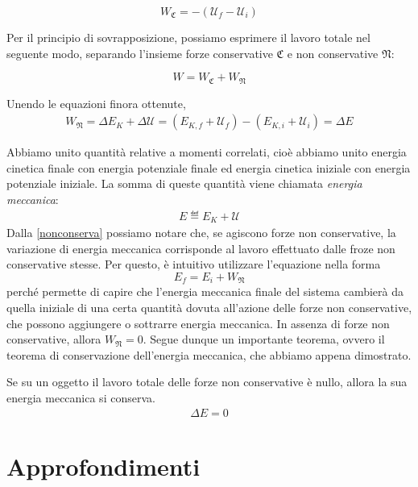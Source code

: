 \[ W_\mathfrak{C} = -(\mathcal{U}_f - \mathcal{U}_i) \]

\noindent Per il principio di sovrapposizione, possiamo esprimere il lavoro totale
nel seguente modo, separando l'insieme forze conservative $\mathfrak{C}$ e non conservative $\mathfrak{N}$:

\[ W = W_\mathfrak{C} + W_\mathfrak{N} \]

\noindent Unendo le equazioni finora ottenute,
\begin{align}
    W_\mathfrak{N} = \Delta E_K + \Delta\mathcal{U} = (E_{K,f} + \mathcal{U}_f) - (E_{K,i} + \mathcal{U}_i) = \Delta E\label{nonconserva}
\end{align}

\noindent Abbiamo unito quantità relative a momenti correlati,
cioè abbiamo unito energia cinetica finale con energia potenziale finale
ed energia cinetica iniziale con energia potenziale iniziale.
La somma di queste quantità viene chiamata \textit{energia meccanica}:
\begin{align}
    E \eqdef E_K + \mathcal{U}
\end{align}
Dalla \ref{nonconserva} possiamo notare che, se agiscono forze non conservative,
la variazione di energia meccanica corrisponde al lavoro effettuato dalle
froze non conservative stesse. Per questo, è intuitivo utilizzare l'equazione
nella forma
\[ E_f = E_i + W_\mathfrak{N} \]
perché permette di capire che l'energia meccanica finale del sistema cambierà
da quella iniziale di una certa quantità dovuta all'azione delle forze non
conservative, che possono aggiungere o sottrarre energia meccanica.
In assenza di forze non conservative, allora $W_\mathfrak{N} = 0$.
Segue dunque un importante teorema, ovvero il teorema di conservazione
dell'energia meccanica, che abbiamo appena dimostrato.

\vspace{8pt}
\begin{tcolorbox}[colback = red!30, colframe = red!30!black, title = {Teorema di conservazione dell'energia meccanica}]
    Se su un oggetto il lavoro totale delle forze non conservative è nullo,
    allora la sua energia meccanica si conserva.
    \begin{align}
        \Delta E = 0
    \end{align}
\end{tcolorbox}
\vspace{5pt}


\section{Approfondimenti}

